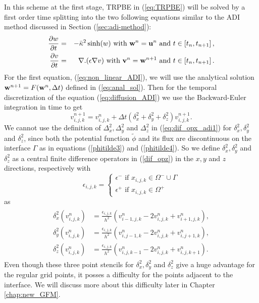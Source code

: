 In this scheme at the first stage, TRPBE in  (\ref{eq:TRPBE}) will be solved by a first order time splitting into the two following equations similar to the ADI method discussed in Section (\ref{sec:adi-method}): 
\begin{eqnarray}
  \frac{\partial w}{\partial t}&=& -\bar\kappa^2 \sinh(w) \text{ with } {\bf w}^n={\bf u}^n\text{ and } t \in \left[t_n,t_{n+1}\right],\label{eq:non_linear_ADI}\\
 \frac{\partial v}{\partial t}&=&  \nabla . (\epsilon\nabla v) \text{ with } {\bf v}^n={\bf w}^{n+1}\text{ and } t \in \left[t_n,t_{n+1}\right].	 \label{eq:diffusion_ADI}
\end{eqnarray}  
For the first equation, (\ref{eq:non_linear_ADI}), we will use the analytical solution ${\bf w}^{n+1}=F({\bf w}^n,\Delta t)$ defined in (\ref{eq:anal_sol}). Then for the temporal discretization of the equation (\ref{eq:diffusion_ADI}) we use the Backward-Euler integration in time to get 
\begin{equation}
	v_{i,j,k}^{n+1} =v_{i,j,k}^{n}+\Delta t \left(\delta_x^2+\delta_y^2+\delta_z^2\right)v_{i,j,k}^{n+1}. \label{eq:imp-eu}
\end{equation}	
We cannot use the definition of $\Delta_x^2,\Delta_y^2$ and $\Delta_z^2$ in (\ref {eq:dif_opx_adi1}) for $\delta_x^2,\delta_y^2$ and $\delta_z^2$, since both the potential function $\tilde \phi$ and its flux are discontinuous on the interface $\Gamma$ as in equations (\ref{phitilde3}) and (\ref{phitilde4}). So we define $\delta_x^2,\delta_y^2$ and $\delta_z^2$ as a central finite difference operators in (\ref{dif_opz}) in the $x,y$ and $z$ directions, respectively with 
\begin{equation}
	\epsilon_{i,j,k}= \displaystyle\begin{cases}
	\epsilon^- \text{ if } x_{i,j,k}\in\Omega^- \cup \Gamma \\
	\epsilon^+ \text{ if } x_{i,j,k}\in\Omega^+
	\end{cases}
\end{equation}
as
 \begin{eqnarray}
 \begin{aligned}
	\delta_x^2\left(v_{i,j,k}^n\right)&= \frac{\epsilon_{i,j,k}}{h^2} \left(v_{i-1,j,k}^n-2v_{i,j,k}^n+v_{i+1,j,k}^n\right), \\ \label{dif_opx}
	\delta_y^2\left(v_{i,j,k}^n\right)&= \frac{\epsilon_{i,j,k}}{h^2} \left(v_{i,j-1,k}^n-2v_{i,j,k}^n+v_{i,j+1,k}^n\right),\\ %
	\delta_z^2\left(v_{i,j,k}^n\right)&= \frac{\epsilon_{i,j,k}}{h^2} \left(v_{i,j,k-1}^n-2v_{i,j,k}^n+v_{i,j,k+1}^n\right). \label{dif_opz}
\end{aligned}
\end{eqnarray}
Even though these three point stencils for $\delta_x^2,\delta_y^2$ and $\delta_z^2$ give a huge advantage for the regular grid points, it posses a difficulty for the points adjacent to the interface. We will discuss more about this difficulty later in Chapter \ref{chap:new_GFM}.
  
